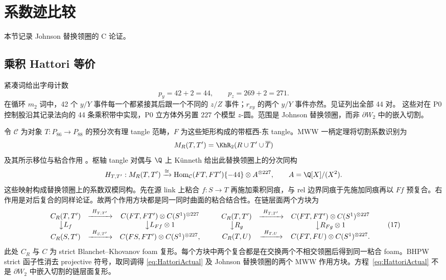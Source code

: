 \section{系数迹比较}\label{sec:c-comparison}

本节记录 Johnson 替换领圈的 C 论证。

\subsection{乘积 Hattori 等价}

紧凑词给出字母计数
\[
p_y=42+2=44,\qquad p_z=269+2=271.
\]
在循环 $m_2$ 词中，42 个 $y/Y$ 事件每一个都紧接其后跟一个不同的 $z/Z$ 事件；$r_{xy}$ 的两个 $y/Y$ 事件亦然。见证列出全部 44 对。
这些对在 P0 控制股沿其记录法向的 44 条乘积带中实现，P0 立方体外另置 $227$ 个模型 $z$-圆。范围是 Johnson 替换领圈，而非 $\partial W_2$ 中的嵌入切割。

令 $\mathcal C$ 为对象 $T:P_{86}\to P_{88}$ 的预分次有理 tangle 范畴，$F$ 为这些矩形构成的带框西-东 tangle。MWW 一柄定理将切割系数识别为
\[
M_R(T,T')=\KhR_2(R\cup T'\cup\overline T)
\]
及其所示移位与粘合作用
\cite[Theorem~4.7]{ManolescuWalkerWedrich2023}。枢轴 tangle 对偶与 $\Q$ 上 K\"unneth 给出此替换领圈上的分次同构
\begin{equation}\label{eq:HattoriActual}
H_{T,T'}:M_R(T,T')\xrightarrow{\cong}
\operatorname{Hom}_{\mathcal C}(FT,FT')\{-44\}
\otimes A^{\otimes227},
\qquad A=\Q[X]/(X^2).
\end{equation}
这些映射构成替换领圈上的系数双模同构。先在源 link 上粘合 $f:S\to T$ 再施加乘积同痕，与 rel 边界同痕于先施加同痕再以 $Ff$ 预复合。右作用是对后复合的同样论证。故两个作用方块都是同一同时曲面的粘合结合性。在链层面两个方块为
\[
\begin{array}{ccc}
C_R(T,T')&\xrightarrow{\ H_{T,T'}\ }&
C(FT,FT')\otimes C(S^1)^{\otimes227}\\
\big\downarrow {L_f}&&\big\downarrow {L_{Ff}\otimes1}\\
C_R(S,T')&\xrightarrow{\ H_{S,T'}\ }&
C(FS,FT')\otimes C(S^1)^{\otimes227},
\end{array}
\qquad
\begin{array}{ccc}
C_R(T,T')&\xrightarrow{\ H_{T,T'}\ }&
C(FT,FT')\otimes C(S^1)^{\otimes227}\\
\big\downarrow {R_g}&&\big\downarrow {R_{Fg}\otimes1}\\
C_R(T,U)&\xrightarrow{\ H_{T,U}\ }&
C(FT,FU)\otimes C(S^1)^{\otimes227}.
\end{array}
\tag{17}
\]
此处 $C_R$ 与 $C$ 为 strict Blanchet--Khovanov foam 复形。每个方块中两个复合都是在交换两个不相交领圈后得到同一粘合 foam。BHPW strict 函子性消去 projective 符号，取同调得 \eqref{eq:HattoriActual} 及 Johnson 替换领圈的两个 MWW 作用方块。方程~\eqref{eq:HattoriActual} 不是 $\partial W_2$ 中嵌入切割的链层面复形。


